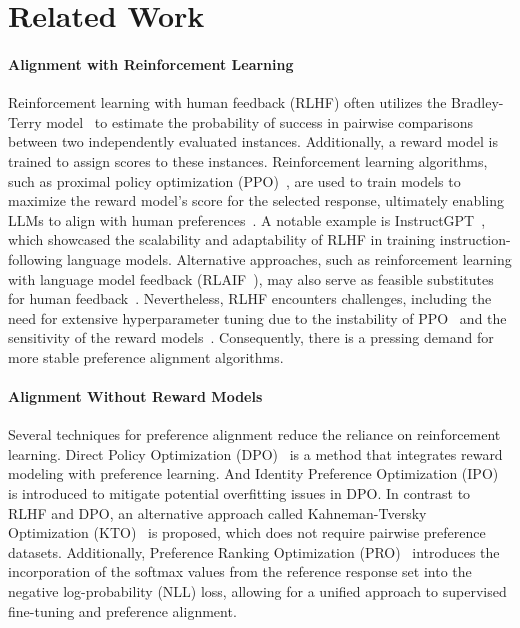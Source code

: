 \section{Related Work}
\paragraph{Alignment with Reinforcement Learning} 
Reinforcement learning with human feedback (RLHF) often utilizes the Bradley-Terry model~\citep{bradley1952rank} to estimate the probability of success in pairwise comparisons between two independently evaluated instances. Additionally, a reward model is trained to assign scores to these instances. Reinforcement learning algorithms, such as proximal policy optimization (PPO)~\citep{schulman2017proximal}, are used to train models to maximize the reward model's score for the selected response, ultimately enabling LLMs to align with human preferences~\citep{stiennon2020learning,ziegler2019fine}. A notable example is InstructGPT~\citep{ouyang2022training}, which showcased the scalability and adaptability of RLHF in training instruction-following language models. Alternative approaches, such as reinforcement learning with language model feedback (RLAIF~\citep{lee2023rlaif}), may also serve as feasible substitutes for human feedback~\citep{bai2022constitutional,sun2023salmon}. Nevertheless, RLHF encounters challenges, including the need for extensive hyperparameter tuning due to the instability of PPO~\citep{rafailov2024direct} and the sensitivity of the reward models~\citep{wang2024secrets}. Consequently, there is a pressing demand for more stable preference alignment algorithms.

\paragraph{Alignment Without Reward Models}
Several techniques for preference alignment reduce the reliance on reinforcement learning.
Direct Policy Optimization (DPO)~\citep{rafailov2024direct} is a method that integrates reward modeling with preference learning. And Identity Preference Optimization (IPO)~\citep{azar2024general} is introduced to mitigate potential overfitting issues in DPO.
In contrast to RLHF and DPO, an alternative approach called Kahneman-Tversky Optimization (KTO)~\citep{ethayarajh2024kto} is proposed, which does not require pairwise preference datasets.
Additionally, Preference Ranking Optimization (PRO)~\citep{song2024preference} introduces the incorporation of the softmax values from the reference response set into the negative log-probability (NLL) loss, allowing for a unified approach to supervised fine-tuning and preference alignment.

